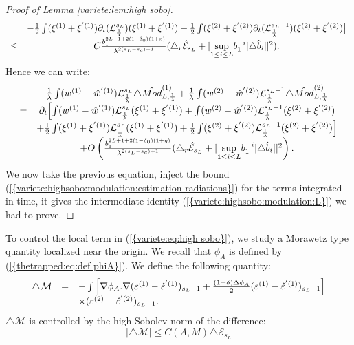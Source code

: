 \documentclass[11pt,a4paper,reqno]{amsart}
\theoremstyle{remark}
\numberwithin{equation}{section}
\begin{document}
\begin{proof}[Proof of Lemma \ref{variete:lem:high sobo}]
$$\begin{array}{r c l}
&-\frac{1}{2}\int (\xi^{(1)}+\xi^{'(1)})\partial_t(\mathcal{L}_{\frac{1}{\lambda}}^{s_L})(\xi^{(1)}+\xi^{'(1)})+ \frac{1}{2}\int (\xi^{(2)}+\xi^{'(2)})\partial_t(\mathcal{L}_{\frac{1}{\lambda}}^{s_L-1})(\xi^{(2)}+\xi^{'(2)}) \bigr{|}\\
\leq& C  \frac{b_1^{2L+1+2(1-\delta_0)(1+\eta)}}{\lambda^{2(s_L-s_c)+1}}(\triangle_r \hat{\mathcal{E}}_{s_L}+|\underset{1\leq i \leq L}{\text{sup}}b_1^{-i}|\triangle \hat{b}_i||^2).
\end{array}
$$
Hence we can write:
$$
\begin{array}{r c l}
&\frac{1}{\lambda}\int (w^{(1)}-\hat{w}^{'(1)})\mathcal{L}_{\frac{1}{\lambda}}^{s_L}\triangle \hat{Mod}^{(1)}_{L,\frac{1}{\lambda}}+\frac{1}{\lambda}\int (w^{(2)}-\hat{w}^{'(2)})\mathcal{L}_{\frac{1}{\lambda}}^{s_L-1}\triangle \hat{Mod}^{(2)}_{L,\frac{1}{\lambda}}\\
=&\partial_t\Bigl{[} \int (w^{(1)}-\hat{w}^{'(1)})\mathcal{L}_{\frac{1}{\lambda}}^{s_L}(\xi^{(1)}+\xi^{'(1)})+ \int (w^{(2)}-\hat{w}^{'(2)})\mathcal{L}_{\frac{1}{\lambda}}^{s_L-1}(\xi^{(2)}+\xi^{'(2)})\\
&+\frac{1}{2}\int (\xi^{(1)}+\xi^{'(1)})\mathcal{L}_{\frac{1}{\lambda}}^{s_L}(\xi^{(1)}+\xi^{'(1)})+ \frac{1}{2}\int (\xi^{(2)}+\xi^{'(2)})\mathcal{L}_{\frac{1}{\lambda}}^{s_L-1}(\xi^{(2)}+\xi^{'(2)}) \Bigr{]}\\
&+O\left( \frac{b_1^{2L+1+2(1-\delta_0)(1+\eta)}}{\lambda^{2(s_L-s_c)+1}}(\triangle_r \hat{\mathcal{E}}_{s_L}+|\underset{1\leq i \leq L}{\text{sup}}b_1^{-i}|\triangle \hat{b}_i||^2 \right).
\end{array}
$$
We now take the previous equation, inject the bound {{\rm (\ref{{variete:highsobo:modulation:estimation radiations}})}} for the terms integrated in time, it gives the intermediate identity {{\rm (\ref{{variete:highsobo:modulation:L}})}} we had to prove. 

\end{proof}

To control the local term in {{\rm (\ref{{variete:eq:high sobo}})}}, we study a Morawetz type quantity localized near the origin. We recall that $\phi_A$ is defined by {{\rm (\ref{{thetrapped:eq:def phiA}})}}. We define the following quantity:
\begin{equation}\label{thetrapped:eq:definition M}
\begin{array}{r c l}
\triangle \mathcal{M}&=& -\int \left[\nabla \phi_A .\nabla (\varepsilon^{(1)}-\hat{\varepsilon}^{'(1)})_{s_L-1}+\frac{(1-\delta)\Delta \phi_A}{2}(\varepsilon^{(1)}-\hat{\varepsilon}^{'(1)})_{s_L-1}\right] \\
&&\times (\varepsilon^{(2)}-\hat{\varepsilon}^{'(2)})_{s_L-1} .
\end{array}
\end{equation}
$\triangle \mathcal{M}$ is controlled by the high Sobolev norm of the difference:
\begin{equation}\label{variete:eq:morawetz controle par high sobo}
|\triangle \mathcal{M} |\leq  C(A,M) \triangle \mathcal{E}_{s_L}
\end{equation}
\end{document}
